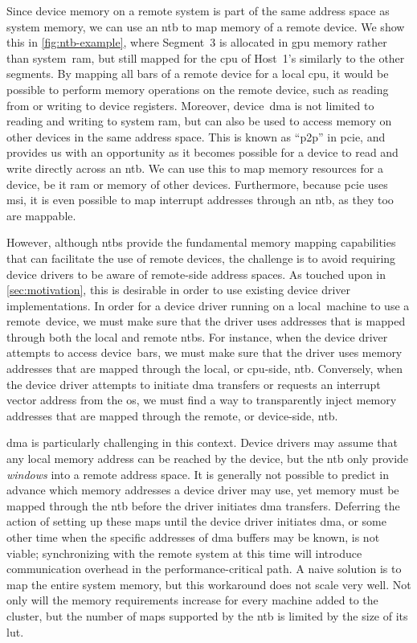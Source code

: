 Since device memory on a remote system is part of the same address space as system memory, we can use an \gls{ntb} to map memory of a remote device.
%
We show this in \cref{fig:ntb-example}, where Segment~3 is allocated in \gls{gpu} memory rather than system~\gls{ram}, but still mapped for the \gls{cpu} of Host~1's similarly to the other segments.
%
By mapping all \glspl{bar} of a remote device for a local \gls{cpu}, it would be possible to perform memory operations on the remote device, such as reading from or writing to device registers.
%
Moreover, device~\gls{dma} is not limited to reading and writing to system \gls{ram}, but can also be used to access memory on other devices in the same address space.
%
This is known as ``\gls{p2p}'' in \gls{pcie}, and provides us with an opportunity as it becomes possible for a device to read and write directly across an \gls{ntb}.
%
We can use this to map memory resources for a device, be it \gls{ram} or memory of other devices. 
%
Furthermore, because \gls{pcie} uses \gls{msi}, it is even possible to map interrupt addresses through an \gls{ntb}, as they too are mappable.



However, although \glspl{ntb} provide the fundamental memory mapping capabilities that can facilitate the use of remote devices, the challenge is to avoid requiring device drivers to be aware of remote-side address spaces.
%
As touched upon in \cref{sec:motivation}, this is desirable in order to use existing device driver implementations.
%
In order for a device driver running on a local~machine to use a remote~device, we must make sure that the driver uses addresses that is mapped through both the local and remote \glspl{ntb}.
%
For instance, when the device driver attempts to access device~\glspl{bar}, we must make sure that the driver uses memory addresses that are mapped through the local, or \gls{cpu}-side, \gls{ntb}.
%
Conversely, when the device driver attempts to initiate \gls{dma} transfers or requests an interrupt vector address from the \gls{os}, we must find a way to transparently inject memory addresses that are mapped through the remote, or device-side, \gls{ntb}.



\Gls{dma} is particularly challenging in this context.
%
Device drivers may assume that any local memory address can be reached by the device, but the \gls{ntb} only provide \emph{windows} into a remote address space.
%
It is generally not possible to predict in advance which memory addresses a device driver may use, yet memory must be mapped through the \gls{ntb} before the driver initiates \gls{dma} transfers.
%
Deferring the action of setting up these maps until the device driver initiates \gls{dma}, or some other time when the specific addresses of \gls{dma} buffers may be known, is not viable;
%
synchronizing with the remote system at this time will introduce communication overhead in the performance-critical path.
%
A naive solution is to map the entire system memory, but this workaround does not scale very well.
%
Not only will the memory requirements increase for every machine added to the cluster, but the number of maps supported by the \gls{ntb} is limited by the size of its \gls{lut}.




